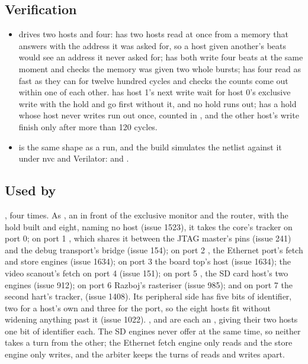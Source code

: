 \subsection*{Verification}

\begin{itemize}
\item {} drives two hosts and four:
 has two hosts read at once from a
memory that answers with the address it was asked for, so a host given
another's beats would see an address it never asked for;
 has both write four beats at
the same moment and checks the memory was given two whole bursts;
 has four read as fast as they can
for twelve hundred cycles and checks the counts come out within one of
each other.
\allowbreak
{} has host 1's
next write wait for host 0's exclusive write with the hold and go
first without it, and no hold runs out;
 has a hold whose host
never writes run out once, counted in , and the other
host's write finish only after more than 120 cycles.
\item {} is the same shape as a
run, and the build simulates the netlist against it under nvc and
Verilator:  and
.
\end{itemize}

\subsection*{Used by}

, four times. As , an
 in front of the
exclusive monitor and the router, with the hold built and
 eight, naming no host (issue 1523), it takes
the core's tracker on port 0; on port 1 , which shares it
between the JTAG master's pins (issue 241) and the debug transport's
bridge (issue 154); on port 2 , the Ethernet port's
fetch and store engines (issue 1634); on port 3 the board top's host
(issue 1634); the video scanout's fetch on port 4 (issue
151); on port 5 , the SD card host's two engines
(issue 912); on port 6 Razboj's rasteriser (issue 985); and on port 7
the second hart's tracker,  (issue 1408). Its peripheral
side has five bits of identifier, two for a host's own and three for
the port, so the eight hosts fit without widening anything past it
(issue 1022). ,  and 
are each an , giving their two hosts
one bit of identifier each. The SD engines never offer at the same
time, so neither takes a turn from the other; the Ethernet fetch engine
only reads and the store engine only writes, and the arbiter keeps the
turns of reads and writes apart.

